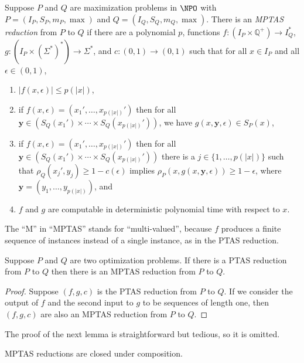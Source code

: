\documentclass{article}
\begin{document}
\begin{definition}\label{def:mptasreduction}
  Suppose $P$ and $Q$ are maximization problems in $\NPO$ with $P = (I_P, S_P, m_P, \max)$ and $Q = (I_Q, S_Q, m_Q, \max)$.
  There is an \emph{MPTAS reduction} from $P$ to $Q$ if there are a polynomial $p$, functions $f \colon \left(I_P \times \mathbb{Q}^+\right) \to I_Q^*$, $g \colon \left(I_P \times {\left(\Sigma^*\right)}^* \right) \to \Sigma^*$, and $c \colon (0, 1) \to (0, 1)$ such that for all $x \in I_P$ and all $\epsilon \in (0, 1)$,
  \begin{enumerate}
  \item $|f(x, \epsilon)| \leq p(|x|)$,
  \item if $f(x, \epsilon) = (x_1', \dotsc, x_{p(|x|)}')$ then for all $\mathbf{y} \in (S_Q(x_1') \times \dotsb \times S_Q(x_{p(|x|)}'))$, we have $g(x, \mathbf{y}, \epsilon) \in S_P(x)$,
  \item if $f(x, \epsilon) = (x_1', \dotsc, x_{p(|x|)}')$ then for all $\mathbf{y} \in (S_Q(x_1') \times \dotsb \times S_Q(x_{p(|x|)}'))$ there is a $j \in \{1, \dotsc, p(|x|)\}$ such that $\rho_Q(x_j', y_j) \geq 1 - c(\epsilon)$ implies $\rho_P(x, g(x, \mathbf{y}, \epsilon)) \geq 1 - \epsilon$, where $\mathbf{y} = (y_1, \dotsc, y_{p(|x|)})$, and
  \item $f$ and $g$ are computable in deterministic polynomial time with respect to $x$.
  \end{enumerate}
\end{definition}

The ``M'' in ``MPTAS'' stands for ``multi-valued'', because $f$ produces a finite sequence of instances instead of a single instance, as in the PTAS reduction.

\begin{lemma}\label{lem:ptasimpliesmptas}
  Suppose $P$ and $Q$ are two optimization problems.
  If there is a PTAS reduction from $P$ to $Q$ then there is an MPTAS reduction from $P$ to $Q$.
\end{lemma}
\begin{proof}
  Suppose $(f, g, c)$ is the PTAS reduction from $P$ to $Q$.
  If we consider the output of $f$ and the second input to $g$ to be sequences of length one, then $(f, g, c)$ are also an MPTAS reduction from $P$ to $Q$.
\end{proof}

The proof of the next lemma is straightforward but tedious, so it is omitted.

\begin{lemma}\label{lem:composition}
  MPTAS reductions are closed under composition.
\end{lemma}
\end{document}
